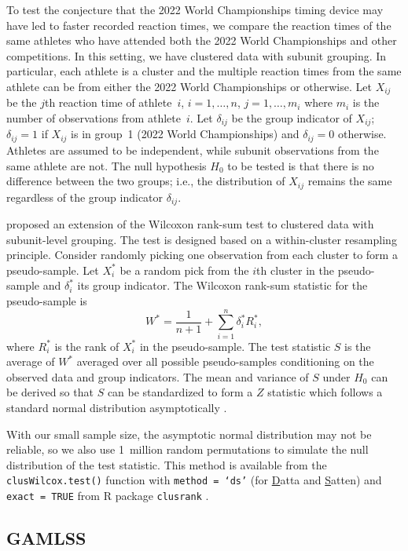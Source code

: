 \documentclass[12pt, letterpaper]{article}
\begin{document}
To test the conjecture that the 2022 World Championships timing device may have 
led to faster recorded reaction times, we compare the reaction times of the same
athletes who have attended both the 2022 World Championships and other 
competitions. 
In this setting, we have clustered data with subunit grouping. In particular,
each athlete is a cluster and the multiple reaction times from the same athlete
can be from either the 2022 World Championships or otherwise.
Let $X_{ij}$ be the $j$th reaction time of athlete~$i$, $i = 1, \ldots, n$,
$j = 1, \ldots, m_i$ where $m_i$ is the number of observations from
athlete~$i$. Let $\delta_{ij}$ be the group indicator of $X_{ij}$; $\delta_{ij}
= 1$ if $X_{ij}$ is in group~1 (2022 World Championships) and $\delta_{ij} = 0$ 
otherwise. Athletes are
assumed to be independent, while subunit observations from the same athlete are
not. The null hypothesis $H_0$ to be tested is that there is no difference
between the two groups; i.e., the distribution of $X_{ij}$ remains the same
regardless of the group indicator $\delta_{ij}$.


\citet{datta2005rank} proposed an extension of the Wilcoxon rank-sum test to
clustered data with subunit-level grouping. The test is designed based on a
within-cluster resampling principle. Consider randomly picking one observation
from each cluster to form a pseudo-sample. Let $X_i^*$ be a random pick from the
$i$th cluster in the pseudo-sample and $\delta_i^*$ its group indicator. The
Wilcoxon rank-sum statistic for the pseudo-sample is
\[
W^* = \frac{1}{n + 1} + \sum_{i=1}^{n} \delta_{i}^{*} R_{i}^{*},
\]
where $R_{i}^{*}$ is the rank of $X_{i}^{*}$ in the pseudo-sample.
The test statistic $S$ is the average of $W^*$ averaged over all possible
pseudo-samples conditioning on the observed data and group indicators.
The mean and variance of $S$ under $H_0$ can be derived so that $S$ can be
standardized to form a $Z$ statistic which follows a standard normal distribution
asymptotically \citep[p.910]{datta2005rank}.


With our small sample size, the asymptotic normal distribution may not be
reliable, so we also use 1~million random permutations to simulate the null 
distribution of the test statistic.
This method is available from the \texttt{clusWilcox.test()} function
with \texttt{method = `ds'} (for \underline{D}atta and \underline{S}atten) and 
\texttt{exact = TRUE} from R package
\texttt{clusrank} \citep{jiang2020wilcoxon}. 


\subsection{GAMLSS}\label{sec:gamlss}
\end{document}
